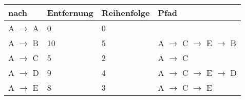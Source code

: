 \documentclass{lehramt-informatik-aufgabe}
\begin{document}
\begin{enumerate}
\begin{liAntwort}
\begin{tabular}{llll}
\bf{nach}                                         & \bf{Entfernung}                                   & \bf{Reihenfolge}                                  & \bf{Pfad}                                         \\
\hline
A  $\rightarrow$  A                               & 0                                                 & 0                                                 &                                                   \\
A  $\rightarrow$  B                               & 10                                                & 5                                                 & A $\rightarrow$ C $\rightarrow$ E $\rightarrow$ B \\
A  $\rightarrow$  C                               & 5                                                 & 2                                                 & A $\rightarrow$ C                                 \\
A  $\rightarrow$  D                               & 9                                                 & 4                                                 & A $\rightarrow$ C $\rightarrow$ E $\rightarrow$ D \\
A  $\rightarrow$  E                               & 8                                                 & 3                                                 & A $\rightarrow$ C $\rightarrow$ E                 \\
\end{tabular}

\end{liAntwort}
\end{enumerate}
\end{document}

